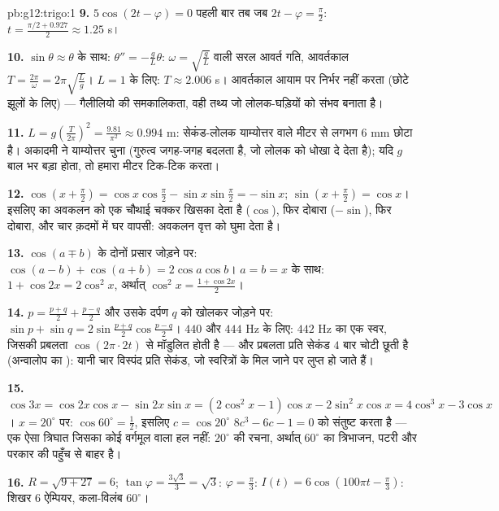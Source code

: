 \begin{solution}{pb:g12:trigo:1}
\textbf{9.} $5\cos(2t - \varphi) = 0$ पहली बार तब जब $2t - \varphi = \frac\pi2$: $t = \frac{\pi/2 + 0.927}{2} \approx 1.25$ s।

\textbf{10.} $\sin\theta \approx \theta$ के साथ: $\theta'' = -\frac gL \theta$: $\omega = \sqrt{\frac gL}$ वाली सरल आवर्त गति, आवर्तकाल $T = \frac{2\pi}{\omega} = 2\pi\sqrt{\frac Lg}$।
$L = 1$ के लिए: $T \approx 2.006$ s। आवर्तकाल आयाम पर निर्भर नहीं करता (छोटे झूलों के लिए)
--- गैलीलियो की समकालिकता, वही तथ्य जो लोलक-घड़ियों को संभव बनाता है।

\textbf{11.} $L = g\left(\frac{T}{2\pi}\right)^2 =
\frac{9.81}{\pi^2} \approx 0.994$ m: सेकंड-लोलक याम्योत्तर वाले मीटर से लगभग $6$ mm छोटा
है। अकादमी ने याम्योत्तर चुना (गुरुत्व जगह-जगह बदलता है, जो लोलक को धोखा दे
देता है); यदि $g$ बाल भर बड़ा होता, तो हमारा मीटर टिक-टिक करता।

\textbf{12.} $\cos\left(x + \frac\pi2\right) =
\cos x \cos\frac\pi2 - \sin x \sin\frac\pi2 = -\sin x$; $\sin\left(x + \frac\pi2\right) = \cos x$। इसलिए  का अवकलन  को एक चौथाई चक्कर खिसका
देता है ($\cos$), फिर दोबारा ($-\sin$), फिर दोबारा, और चार क़दमों में घर वापसी:
अवकलन वृत्त को घुमा देता है।

\textbf{13.} $\cos(a \mp b)$ के दोनों प्रसार जोड़ने पर: $\cos(a-b) + \cos(a+b) = 2\cos a\cos b$। $a = b = x$ के साथ: $1 + \cos 2x = 2\cos^2 x$,
अर्थात् $\cos^2 x = \frac{1 + \cos 2x}{2}$।

\textbf{14.} $p = \frac{p+q}{2} + \frac{p-q}{2}$ और उसके दर्पण $q$ को खोलकर जोड़ने पर: $\sin p + \sin q = 2\sin\frac{p+q}{2}\cos\frac{p-q}{2}$। $440$ और
$444$ Hz के लिए: $442$ Hz का एक स्वर, जिसकी प्रबलता $\cos(2\pi \cdot 2t)$ से मॉडुलित होती है
--- और प्रबलता प्रति सेकंड $4$ बार चोटी छूती है (अन्वालोप का ):
यानी चार विस्पंद प्रति सेकंड, जो स्वरित्रों के मिल जाने पर लुप्त हो जाते हैं।

\textbf{15.} $\cos 3x = \cos 2x\cos x - \sin 2x \sin x =
(2\cos^2 x - 1)\cos x - 2\sin^2 x\cos x = 4\cos^3 x -
3\cos x$। $x = 20^\circ$ पर: $\cos 60^\circ = \frac12$, इसलिए $c = \cos 20^\circ$ $8c^3 - 6c - 1 = 0$ को संतुष्ट करता है ---
एक ऐसा त्रिघात जिसका कोई वर्गमूल वाला हल नहीं: $20^\circ$ की रचना, अर्थात् $60^\circ$
का त्रिभाजन, पटरी और परकार की पहुँच से बाहर है।

\textbf{16.} $R = \sqrt{9 + 27} = 6$; $\tan\varphi = \frac{3\sqrt3}{3} = \sqrt3$: $\varphi = \frac\pi3$: $I(t) = 6\cos\left(100\pi t -
\frac\pi3\right)$: शिखर $6$ ऐम्पियर, कला-विलंब $60^\circ$।


\end{solution}
